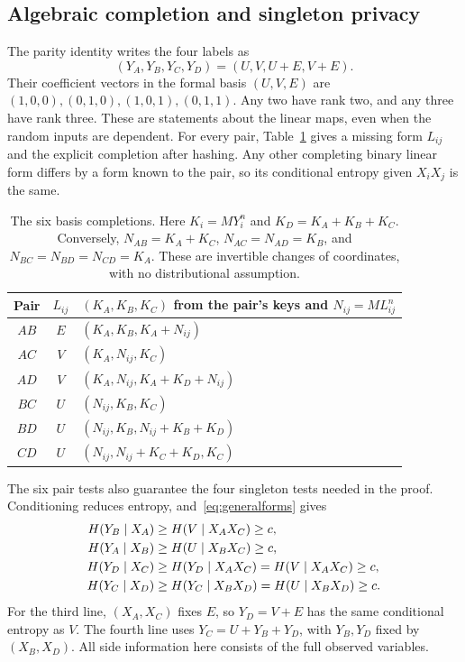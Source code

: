 \subsection{Algebraic completion and singleton privacy}
The parity identity writes the four labels as
\begin{equation}\label{eq:generalforms}
 (Y_A,Y_B,Y_C,Y_D)=(U,V,U+E,V+E).
\end{equation}
Their coefficient vectors in the formal basis $(U,V,E)$ are
$(1,0,0),(0,1,0),(1,0,1),(0,1,1)$.
Any two have rank two, and any three have rank three. These are statements
about the linear maps, even when the random inputs are dependent.
For every pair, Table~\ref{tab:basis} gives a missing form $L_{ij}$
and the explicit completion after hashing. Any other completing binary
linear form differs by a form known to the pair, so its conditional
entropy given $X_iX_j$ is the same.
\begin{table}[ht]
\centering
\begin{tabular}{@{}ccl@{}}
\toprule
Pair & $L_{ij}$ & $(K_A,K_B,K_C)$ from the pair's keys and $N_{ij}=ML_{ij}^n$\\
\midrule
$AB$ & $E$ & $(K_A,K_B,K_A+N_{ij})$\\
$AC$ & $V$ & $(K_A,N_{ij},K_C)$\\
$AD$ & $V$ & $(K_A,N_{ij},K_A+K_D+N_{ij})$\\
$BC$ & $U$ & $(N_{ij},K_B,K_C)$\\
$BD$ & $U$ & $(N_{ij},K_B,N_{ij}+K_B+K_D)$\\
$CD$ & $U$ & $(N_{ij},N_{ij}+K_C+K_D,K_C)$\\
\bottomrule
\end{tabular}
\caption{The six basis completions. Here $K_i=MY_i^n$ and
$K_D=K_A+K_B+K_C$. Conversely, $N_{AB}=K_A+K_C$,
$N_{AC}=N_{AD}=K_B$, and $N_{BC}=N_{BD}=N_{CD}=K_A$.
These are invertible changes of coordinates, with no distributional assumption.}
\label{tab:basis}
\end{table}

The six pair tests also guarantee the four singleton tests needed in the
proof. Conditioning reduces entropy, and~\eqref{eq:generalforms} gives
\begin{align}
 H(Y_B\mid X_A)&\ge H(V\mid X_AX_C)\ge c,\notag\\
 H(Y_A\mid X_B)&\ge H(U\mid X_BX_C)\ge c,\notag\\
 H(Y_D\mid X_C)&\ge H(Y_D\mid X_AX_C)=H(V\mid X_AX_C)\ge c,\label{eq:siximplyten}\\
 H(Y_C\mid X_D)&\ge H(Y_C\mid X_BX_D)=H(U\mid X_BX_D)\ge c.\notag
\end{align}
For the third line, $(X_A,X_C)$ fixes $E$, so $Y_D=V+E$ has the
same conditional entropy as $V$. The fourth line uses
$Y_C=U+Y_B+Y_D$, with $Y_B,Y_D$ fixed by $(X_B,X_D)$.
All side information here consists of the full observed variables.


